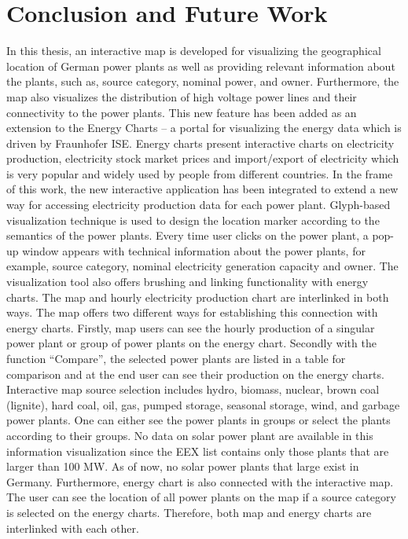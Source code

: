 \chapter{Conclusion and Future Work}
\label{chap:conclusion}

In this thesis, an interactive map is developed for visualizing the geographical location of German power plants as well as providing relevant information about the plants, such as, source category, nominal power, and owner. Furthermore, the map also visualizes the distribution of high voltage power lines and their connectivity to the power plants. This new feature has been added as an extension to the Energy Charts – a portal for visualizing the energy data which is driven by Fraunhofer ISE. Energy charts present interactive charts on electricity production, electricity stock market prices and import/export of electricity which is very popular and widely used by people from different countries. In the frame of this work, the new interactive application has been integrated to extend a new way for accessing electricity production data for each power plant. Glyph-based visualization technique is used to design the location marker according to the semantics of the power plants. Every time user clicks on the power plant, a pop-up window appears with technical information about the power plants, for example, source category, nominal electricity generation capacity and owner. The visualization tool also offers brushing and linking functionality with energy charts. The map and hourly electricity production chart are interlinked in both ways. The map offers two different ways for establishing this connection with energy charts. Firstly, map users can see the hourly production of a singular power plant or group of power plants on the energy chart. Secondly with the function “Compare”, the selected power plants are listed in a table for comparison and at the end user can see their production on the energy charts. Interactive map source selection includes hydro, biomass, nuclear, brown coal (lignite), hard coal, oil, gas, pumped storage, seasonal storage, wind, and garbage power plants. One can either see the power plants in groups or select the plants according to their groups. No data on solar power plant are available in this information visualization since the EEX list contains only those plants that are larger than 100 MW. As of now, no solar power plants that large exist in Germany. Furthermore, energy chart is also connected with the interactive map. The user can see the location of all power plants on the map if a source category is selected on the energy charts. Therefore, both map and energy charts are interlinked with each other.  


